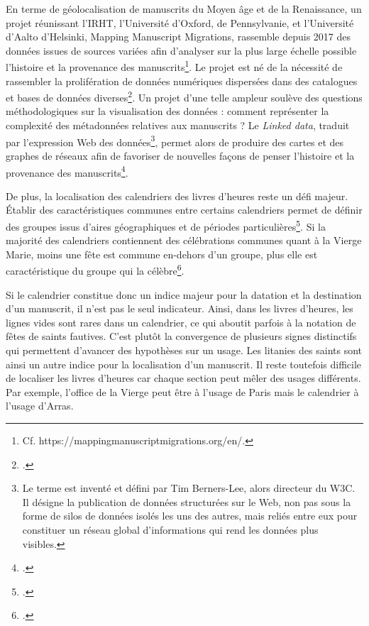 \documentclass[a4paper,12pt,twoside]{book}
\begin{document}
En terme de géolocalisation de manuscrits du Moyen âge et de la Renaissance, un projet réunissant l'IRHT, l'Université d'Oxford, de Pennsylvanie, et l'Université d'Aalto d'Helsinki, \og Mapping Manuscript Migrations\fg{}, rassemble depuis 2017 des données issues de sources variées afin d'analyser sur la plus large échelle possible l'histoire et la provenance des manuscrits\footnote{Cf. https://mappingmanuscriptmigrations.org/en/.}. Le projet est né de la nécessité de rassembler la prolifération de données numériques dispersées dans des catalogues et bases de données diverses\footcite[p. 249-250]{map_man_migration}. Un projet d'une telle ampleur soulève des questions méthodologiques sur la visualisation des données : comment représenter la complexité des métadonnées relatives aux manuscrits ? Le \textit{Linked data}, traduit par l'expression Web des données\footnote{Le terme est inventé et défini par Tim Berners-Lee, alors directeur du W3C. Il désigne la publication de données structurées sur le Web, non pas sous la forme de silos de données isolés les uns des autres, mais reliés entre eux pour constituer un réseau global d'informations qui rend les données plus visibles.}, permet alors de produire des cartes et des graphes de réseaux afin de favoriser de nouvelles façons de penser l'histoire et la provenance des manuscrits\footcite[p. 251]{map_man_migration}.

	
	De plus, la localisation des calendriers des livres d'heures reste un défi majeur. Établir des caractéristiques communes entre certains calendriers permet de définir des groupes issus d'aires géographiques et de périodes particulières\footcite[p. 781]{analyse_calendrier}. Si la majorité des calendriers contiennent des célébrations communes quant à la Vierge Marie, moins une fête est commune en-dehors d'un groupe, plus elle est caractéristique du groupe qui la célèbre\footcite[p. 781]{analyse_calendrier}. 
	
	Si le calendrier constitue donc un indice majeur pour la datation et la destination d'un manuscrit, il n'est pas le seul indicateur. Ainsi, dans les livres d'heures, les lignes vides sont rares dans un calendrier, ce qui aboutit parfois à la notation de fêtes de saints fautives. C'est plutôt la convergence de plusieurs signes distinctifs qui permettent d'avancer des hypothèses sur un usage. Les litanies des saints sont ainsi un autre indice pour la localisation d'un manuscrit. Il reste toutefois difficile de localiser les livres d’heures car chaque section peut mêler des usages différents. Par exemple, l'office de la Vierge peut être à l’usage de Paris mais le calendrier à l’usage d’Arras.\\
	
\end{document}
